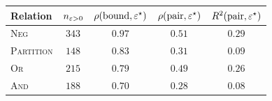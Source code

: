 \begin{tabular}{@{}lcccc@{}}
\toprule
Relation           & $n_{\varepsilon>0}$ & $\rho(\text{bound}, \varepsilon^\star)$ & $\rho(\text{pair}, \varepsilon^\star)$ & $R^2(\text{pair}, \varepsilon^\star)$ \\
\midrule
\textsc{Neg}       & $343$        & $0.97$ & $0.51$ & $0.29$ \\
\textsc{Partition} & $148$        & $0.83$ & $0.31$ & $0.09$ \\
\textsc{Or}        & $215$        & $0.79$ & $0.49$ & $0.26$ \\
\textsc{And}       & $188$        & $0.70$ & $0.28$ & $0.08$ \\
\bottomrule
\end{tabular}
